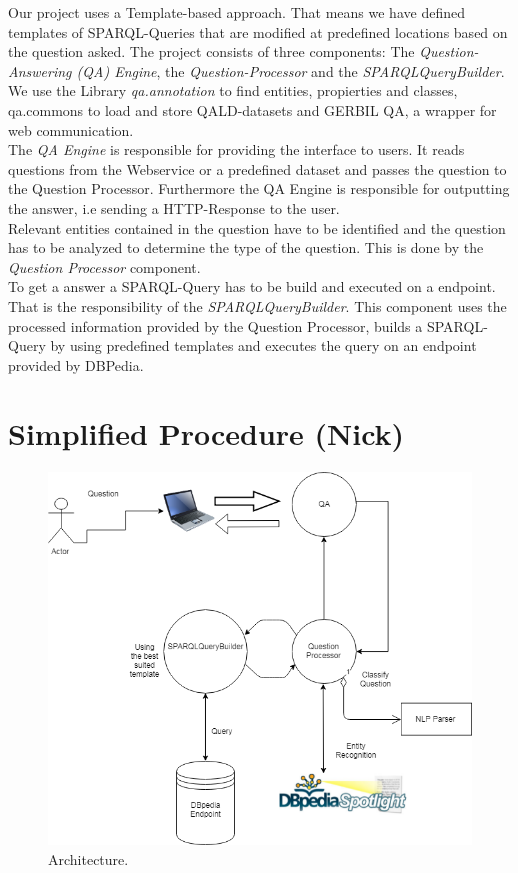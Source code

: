 \documentclass[runningheads]{llncs}
\begin{document}
Our project uses a Template-based approach. That means we have defined templates of SPARQL-Queries that are modified at predefined locations based on the question asked. The project consists of three components: The \emph{Question-Answering (QA) Engine}, the \emph{Question-Processor} and the \emph{SPARQLQueryBuilder}. We use the Library \emph{qa.annotation} to find entities, propierties and classes, qa.commons to load and store QALD-datasets and GERBIL QA, a wrapper for web communication.   \\

The \emph{QA Engine} is responsible for providing the interface to users. It reads questions from the Webservice or a predefined dataset and passes the question to the Question Processor. Furthermore the QA Engine is responsible for outputting the answer, i.e sending a HTTP-Response to the user. \\

Relevant entities contained in the question have to be identified and the question has to be analyzed to determine the type of the question. This is done by the \emph{Question Processor} component. \\

To get a answer a SPARQL-Query has to be build and executed on a endpoint. That is the responsibility of the \emph{SPARQLQueryBuilder}. This component uses the processed information provided by the Question Processor, builds a SPARQL-Query by using predefined templates and executes the query on an endpoint provided by DBPedia. 

\pagebreak
\section{Simplified Procedure (Nick)} 
\begin{figure}
	\includegraphics[width=\textwidth]{Architecture.PNG}
	
	\caption{Architecture.}
	\label{fig1} 
\end{figure}
\end{document}
